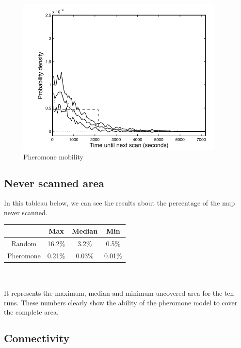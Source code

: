 \begin{figure}[!h]
\caption{\label{pheromonechar} Pheromone mobility}
   \includegraphics{../images/pheromone_scan_characteristic.png}
\end{figure}

\newpage

\subsection{Never scanned area}

In this tableau below, we can see the results about the percentage of the map never scanned.\\

\begin{tabular}{|c|c|c|c|}
\hline
	      & Max & Median & Min \\
	      \hline
	Random & 16.2\% & 3.2\% & 0.5\% \\
	\hline
	Pheromone & 0.21\% & 0.03\% & 0.01\% \\
	\hline
\end{tabular}\\\\

It represents the maximum, median and minimum uncovered area for the ten runs. These numbers clearly show the ability of the pheromone model to cover the complete area. 

\newpage

\subsection{Connectivity}

